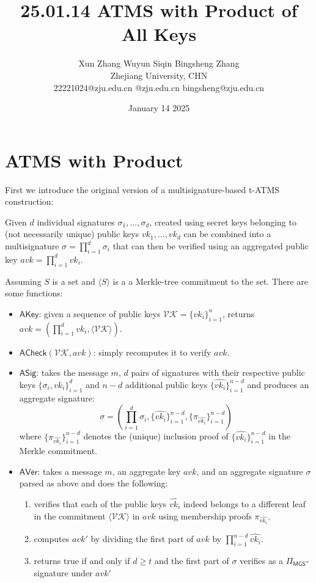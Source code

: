 \documentclass{article}
\title{25.01.14 ATMS with Product of All Keys}
\author{Xun Zhang \quad \quad Wuyun Siqin \quad \quad Bingsheng Zhang \\ 
Zhejiang University, CHN \\
22221024@zju.edu.cn \quad 3210101763@zju.edu.cn \quad bingsheng@zju.edu.cn}
\date{January 14 2025}
\begin{document}
\maketitle

\section{ATMS with Product}

First we introduce the original version of a multisignature-based t-ATMS construction:

Given $d$ individual signatures $\sigma_1, \ldots, \sigma_d$, created using secret keys belonging to (not
necessarily unique) public keys $vk_1, \ldots, vk_d$ can be combined into a multisignature $\sigma = \prod_{i=1}^d \sigma_i$ that can then be verified using an aggregated public key $avk = \prod_{i=1}^d vk_i$.

Assuming $S$ is a set and $\langle S \rangle$ is a a Merkle-tree commitment to the set. There are some functions:

\begin{itemize}
    \item $\mathsf{AKey}$: given a sequence of public keys $\mathcal{VK} = \{vk_i\}_{i=1}^n$, returns $avk = (\prod_{i=1}^d vk_i, \langle \mathcal{VK}\rangle)$.
    \item $\mathsf{ACheck}(\mathcal{VK},avk)$: simply recomputes it to verify $avk$.
    \item $\mathsf{ASig}$: takes the message $m$, $d$ pairs of signatures with their respective public keys $\{\sigma_i, vk_i\}_{i=1}^d$ and $n-d$ additional public keys $\{\widehat{vk_i}\}_{i=1}^{n-d}$ and produces an aggregate signature:
    \[
    \sigma = \left ( \prod_{i=1}^d \sigma_i , \{\widehat{vk_i}\}_{i=1}^{n-d}, \{\pi_{\widehat{vk_i}}\}_{i=1}^{n-d}\right )
    \]
    where $\{\pi_{\widehat{vk_i}}\}_{i=1}^{n-d}$ denotes the (unique) inclusion proof of $\{{\widehat{vk_i}}\}_{i=1}^{n-d}$ in the Merkle commitment.
    \item $\mathsf{AVer}$: takes a message $m$, an aggregate key $avk$, and an aggregate signature $\sigma$ parsed as above and does the following: 
    \begin{enumerate}
        \item verifies that each of the public keys $\widehat{vk_i}$ indeed belongs to a different leaf
        in the commitment $\langle \mathcal{VK}\rangle$ in $avk$ using membership proofs $\pi_{\widehat{vk_i}}$.
        \item computes $avk'$ by dividing the first part of $avk$ by $\prod_{i=1}^{n-d} \widehat{vk_i}$.
        \item returns true if and only if $d \geq t$ and the first part of $\sigma$ verifies as a $\Pi_\mathsf{MGS}$-signature
        under $avk'$
    \end{enumerate}
\end{itemize}
\end{document}
